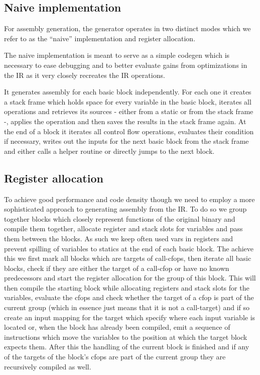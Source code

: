 \documentclass[course=eragp]{aspdoc}
\begin{document}
\subsection{Naive implementation}

For assembly generation, the generator operates in two distinct modes which we refer to as the
``naive'' implementation and register allocation.

\par

The naive implementation is meant to serve as a simple codegen which is necessary to ease debugging
and to better evaluate gains from
optimizations in the IR as it very closely recreates the IR operations.

\par

It generates assembly for each basic block independently.
For each one it creates a stack frame which holds space for every variable in the basic block, iterates all operations and
retrieves its sources - either from a static or from the stack frame -, applies the operation and then saves the results in the stack frame again.
At the end of a block it iterates all control flow operations, evaluates their condition if necessary, writes out the inputs for the next basic block
from the stack frame and either calls a helper routine or directly jumps to the next block.

\subsection{Register allocation}
To achieve good performance and code density though we need to employ a more sophisticated approach to generating assembly from the IR.
To do so we group together blocks which closely represent functions of the original binary and compile them together, allocate register and stack slots
for variables and pass them between the blocks. As such we keep often used vars in registers and prevent spilling of variables to statics at the end of each basic block.
The achieve this we first mark all blocks which are targets of call-cfops, then iterate all basic blocks, check if they are either the target of a call-cfop or have no known predecessors
and start the register allocation for the group of this block.
This will then compile the starting block while allocating registers and stack slots for the variables, evaluate the cfops and check whether the target of a cfop is part of the current group 
(which in essence just means that it is not a call-target) and if so create an input mapping for the target which specify where each input variable is located or, when the block has already been compiled,
emit a sequence of instructions which move the variables to the position at which the target block expects them.
After this the handling of the current block is finished and if any of the targets of the block's cfops are part of the current group they are recursively compiled as well.
\end{document}
